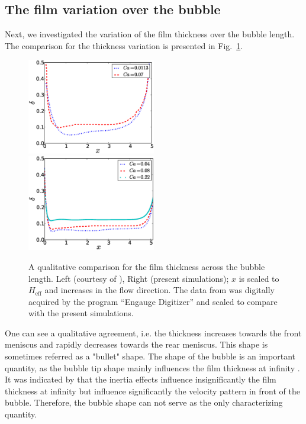 \documentclass[preprint,12pt]{elsarticle}
\begin{document}
\subsection{The film variation over the bubble}
\label{section:film:thickness:variation}
Next, we investigated the variation of the film thickness over the bubble length.
The comparison for the thickness variation is presented in Fig.~\ref{fig:sehgal:bubble:length}.
\begin{figure}
\includegraphics[width=0.5\textwidth]{Figures/Bubble/bubble_sehgal_new.eps}\hfill
\includegraphics[width=0.5\textwidth]{Figures/Bubble/bubble_length_new.eps}\\
\caption{A qualitative comparison for the film thickness across
the bubble length. {\color{red} Left} (courtesy of \citet{sehgal-microchannel}),
{\color{red} Right}  (present simulations); $x$ is scaled to $H_{\mathrm{eff}}$
and increases in the flow direction.{\color{red} The data from
\cite{sehgal-microchannel} was digitally acquired by the program ``Engauge Digitizer'' and scaled
to compare with the present simulations.} \label{fig:sehgal:bubble:length}}
\end{figure}
One can see a qualitative agreement, i.e. the thickness increases towards the front meniscus and
rapidly decreases towards the rear meniscus. This shape is sometimes referred as a "bullet"
shape.
{\color{red} The shape of the bubble is an important quantity, as the bubble tip shape mainly
influences the film thickness at infinity \cite{bretherton}. It was indicated by
\citet{heil-bretherton} that the inertia effects influence insignificantly the film thickness at
infinity but influence significantly the velocity pattern in front of the bubble. Therefore, the
bubble shape can not serve as the only characterizing quantity.}
\end{document}
